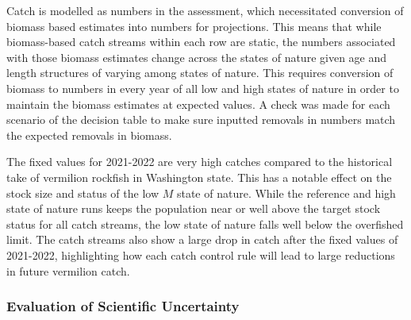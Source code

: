 \documentclass[11pt,
  english,
  a4paper,
]{article}
\begin{document}
\leavevmode\tagmcend\tagstructend\par


Catch is modelled as numbers in the assessment, which necessitated conversion of biomass based estimates into numbers for projections. This means that while biomass-based catch streams within each row are static, the numbers associated with those biomass estimates change across the states of nature given age and length structures of varying among states of nature. This requires conversion of biomass to numbers in every year of all low and high states of nature in order to maintain the biomass estimates at expected values. A check was made for each scenario of the decision table to make sure inputted removals in numbers match the expected removals in biomass.

\leavevmode\tagmcend\tagstructend\par


The fixed values for 2021-2022 are very high catches compared to the historical take of vermilion rockfish in Washington state. This has a notable effect on the stock size and status of the low {\(M\)\leavevmode\tagmcend\tagstructend} state of nature. While the reference and high state of nature runs keeps the population near or well above the target stock status for all catch streams, the low state of nature falls well below the overfished limit. The catch streams also show a large drop in catch after the fixed values of 2021-2022, highlighting how each catch control rule will lead to large reductions in future vermilion catch.

\leavevmode\tagmcend\tagstructend\par


\hypertarget{evaluation-of-scientific-uncertainty}{%
\subsubsection{Evaluation of Scientific Uncertainty}\label{evaluation-of-scientific-uncertainty}}

\leavevmode\tagmcend\tagstructend

\end{document}
